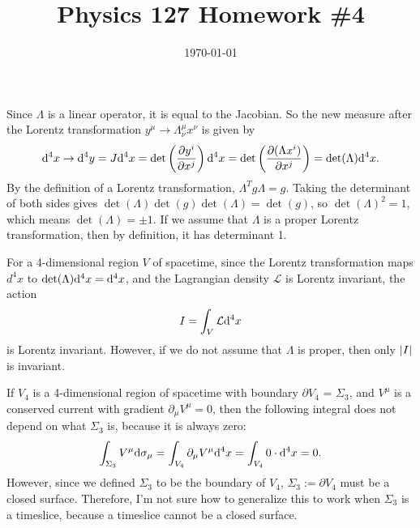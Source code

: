 \documentclass{article}
\date{\today}
\title{Physics 127 Homework \#4}
\begin{document}
\maketitle

\begin{prob}
\end{prob}
Since $\Lambda$ is a linear operator, it is equal to the Jacobian. So the new measure after the Lorentz transformation $y^\mu \rightarrow \Lambda_\nu^\mu x^\nu$ is given by
\[ \mathrm{d}^4 x \rightarrow \mathrm{d}^4 y = J \mathrm{d}^4 x = \det \left( \frac{\partial y^i}{\partial x^j} \right) \mathrm{d}^4 x = \det \left( \frac{\partial (\Lambda x^i)}{\partial x^j} \right) = \det (\Lambda) \mathrm{d}^4 x.  \]
By the definition of a Lorentz transformation, $\Lambda^T g \Lambda = g$. Taking the determinant of both sides gives $\det(\Lambda) \det(g) \det(\Lambda) = \det(g)$, so $\det(\Lambda)^2=1$, which means $\det(\Lambda) = \pm 1$. If we assume that $\Lambda$ is a proper Lorentz transformation, then by definition, it has determinant 1.
\par
For a 4-dimensional region $V$ of spacetime, since the Lorentz transformation maps $d^4 x$ to $\det(\Lambda) \mathrm{d}^4 x = \mathrm{d}^4 x$, and the Lagrangian density $\mathcal{L}$ is Lorentz invariant, the action
\[ I = \int_V \mathcal{L} \mathrm{d}^4 x \]
is Lorentz invariant. However, if we do not assume that $\Lambda$ is proper, then only $\left\lvert I \right\rvert$ is invariant.

\bigskip
\par
\begin{prob}
\end{prob}
If $V_4$ is a 4-dimensional region of spacetime with boundary $\partial V_4$ = $\Sigma_3$, and $V^\mu$ is a conserved current with gradient $\partial_\mu V^\mu = 0$, then the following integral does not depend on what $\Sigma_3$ is, because it is always zero:
\[ \int_{\Sigma_3} V^\mu \mathrm{d} \sigma_\mu = \int_{V_4} \partial_\mu V^\mu \mathrm{d}^4 x = \int_{V_4} 0 \cdot \mathrm{d}^4 x = 0. \]
However, since we defined $\Sigma_3$ to be the boundary of $V_4$, $\Sigma_3 := \partial V_4$ must be a closed surface. Therefore, I'm not sure how to generalize this to work when $\Sigma_3$ is a timeslice, because a timeslice cannot be a closed surface.

\bigskip
\par
\begin{prob}
\end{prob}

\bigskip
\par
\begin{prob}
\end{prob}

\bigskip
\par
\begin{prob}
\end{prob}


\end{document}

